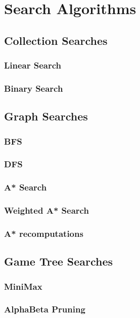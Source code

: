 \documentclass[12pt, letterpaper]{book}
\begin{document}
	\chapter{Search Algorithms}

	\section{Collection Searches}
		\subsection{Linear Search} \label{linear search}
		\subsection{Binary Search} \label{binary search}

	\section{Graph Searches}
		\subsection{BFS}
		\subsection{DFS}
		\subsection{A* Search}
		\subsection{Weighted A* Search}
		\subsection{A* recomputations}

	\section{Game Tree Searches} \label{game trees}
		\subsection{MiniMax} \label{minimax}
		\subsection{AlphaBeta Pruning}
\end{document}
